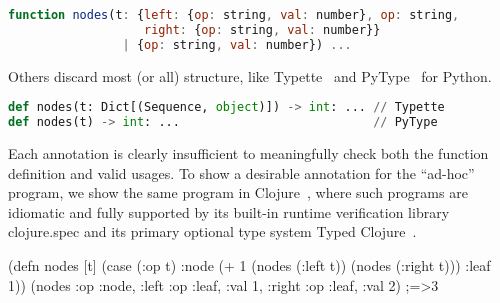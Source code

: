 \begin{lstlisting}[language=JavaScript]
function nodes(t: {left: {op: string, val: number}, op: string,
                   right: {op: string, val: number}}
                | {op: string, val: number}) ...
\end{lstlisting}

Others discard most (or all) structure, like Typette~ 
and PyType~ for Python.

\begin{lstlisting}[language=Python]
def nodes(t: Dict[(Sequence, object)]) -> int: ... // Typette
def nodes(t) -> int: ...                           // PyType
\end{lstlisting}

Each annotation is clearly insufficient to meaningfully check both the function definition
and valid usages. To show a desirable annotation for the ``ad-hoc'' program,
we show the same program in Clojure~, where such programs
are idiomatic and fully supported by its built-in runtime verification library
clojure.spec and its primary optional type system Typed Clojure~.

\begin{cljlisting}
(defn nodes [t] (case (:op t)
                  :node (+ 1 (nodes (:left t)) (nodes (:right t)))
                  :leaf 1))
(nodes {:op :node, :left {:op :leaf, :val 1}, :right {:op :leaf, :val 2}}) ;=>3
\end{cljlisting}

